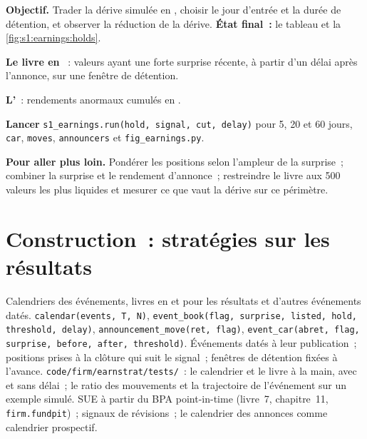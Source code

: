 \begin{tutorial}
\textbf{Objectif.} Trader la dérive simulée en , choisir le jour d'entrée et la durée de détention, et observer la réduction de la dérive. \textbf{État final~:} le
tableau et la \cref{fig:s1:earnings:holds}.
\begin{tutsteps}
\item \textbf{Le livre en }~: valeurs ayant une forte surprise récente, à partir d'un délai après l'annonce, sur une fenêtre de détention.
\label{lst:s1:earnings:book}
\item \textbf{L'}~: rendements anormaux cumulés en .
\label{lst:s1:earnings:car}
\item \textbf{Lancer} \texttt{s1\_earnings.run(hold, signal, cut, delay)} pour 5, 20 et 60 jours, \texttt{car}, \texttt{moves}, \texttt{announcers} et
\texttt{fig\_earnings.py}.
\end{tutsteps}
\textbf{Pour aller plus loin.} Pondérer les positions selon l'ampleur de la surprise~; combiner la surprise et le rendement d'annonce~; restreindre le livre aux 500
valeurs les plus liquides et mesurer ce que vaut la dérive sur ce périmètre.
\end{tutorial}

\section{Construction~: stratégies sur les résultats}\label{bld:s1:earnings:earnstrat}

\begin{build}
 Calendriers des événements, livres en  et  pour les résultats et d'autres événements datés.
 \texttt{calendar(events, T, N)}, \texttt{event\_book(flag, surprise, listed, hold, threshold, delay)},
\texttt{announcement\_move(ret, flag)}, \texttt{event\_car(abret, flag, surprise, before, after, threshold)}.
 Événements datés à leur publication~; positions prises à la clôture qui suit le signal~; fenêtres de détention fixées à l'avance.
 \texttt{code/firm/earnstrat/tests/}~: le calendrier et le livre à la main, avec et sans délai~; le ratio des mouvements et la trajectoire
de l'événement sur un exemple simulé.
 SUE à partir du BPA point-in-time (livre~7, chapitre~11, \texttt{firm.fundpit})~; signaux de révisions~; le calendrier des annonces comme calendrier prospectif.
\end{build}

